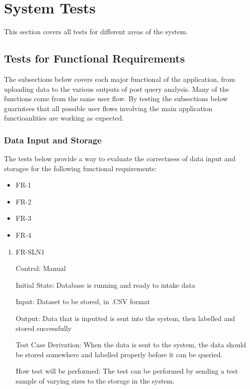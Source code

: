 \documentclass[12pt, titlepage]{article}
\begin{document}


\section{System Tests}
This section covers all tests for different areas of the system.

\subsection{Tests for Functional Requirements}

The subsections below covers each major functional of the application, from uploading data to the various outputs of post query analysis. Many of the functions come from the same user flow. By testing the subsections below guarintees that all possible user flows involving the main application functioanlities are working as expected. 

\subsubsection{Data Input and Storage}
The tests below provide a way to evaluate the correctness of data input and storagee for the following functional requirements:
\begin{itemize}
  \item FR-1
  \item FR-2
  \item FR-3
  \item FR-4
\end{itemize}

\begin{enumerate}

\item{FR-SLN1}

Control: Manual
					
Initial State: Database is running and ready to intake data
					
Input: Dataset to be stored, in .CSV format
					
Output: Data that is inputted is sent into the system, then labelled and stored successfully

Test Case Derivation: When the data is sent to the system, the data should be stored somewhere and labelled properly before it can be queried.
					
How test will be performed: The test can be performed by sending a test sample of varying sizes to the storage in the system.

\end{enumerate}
\end{document}
